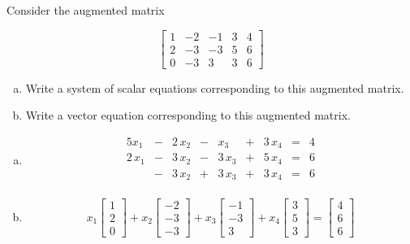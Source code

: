 
\begin{exerciseStatement}


 Consider the augmented matrix 

\[ \left[\begin{array}{cccc|c}
1 & -2 & -1 & 3 & 4 \\
2 & -3 & -3 & 5 & 6 \\
0 & -3 & 3 & 3 & 6
\end{array}\right] \]
\begin{enumerate}[(a)]
\item  Write a system of scalar equations corresponding to this augmented matrix. 
\item  Write a vector equation corresponding to this augmented matrix. 
\end{enumerate}
    
\end{exerciseStatement}
    
\begin{exerciseAnswer} 

\begin{enumerate}[(a)]
\item 
\begin{alignat*}{5} x_{1} &-& 2 \, x_{2} &-& x_{3} &+& 3 \, x_{4} &=& 4 \\2 \, x_{1} &-& 3 \, x_{2} &-& 3 \, x_{3} &+& 5 \, x_{4} &=& 6 \\ &-& 3 \, x_{2} &+& 3 \, x_{3} &+& 3 \, x_{4} &=& 6 \\ \end{alignat*}
            
\item \[ x_{1} \left[\begin{array}{c}
1 \\
2 \\
0
\end{array}\right] + x_{2} \left[\begin{array}{c}
-2 \\
-3 \\
-3
\end{array}\right] + x_{3} \left[\begin{array}{c}
-1 \\
-3 \\
3
\end{array}\right] + x_{4} \left[\begin{array}{c}
3 \\
5 \\
3
\end{array}\right] = \left[\begin{array}{c}
4 \\
6 \\
6
\end{array}\right] \]
\end{enumerate}
    
\end{exerciseAnswer}
    
